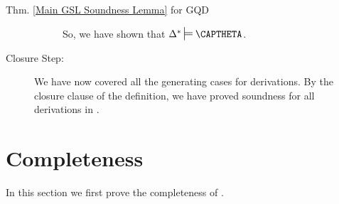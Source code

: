 \begin{PROOFOF}{Thm. \ref{Main GSL Soundness Lemma} for GQD}
\begin{description}
\begin{description}
So, we have shown that $\Delta^*\sdtstile{}{}\CAPTHETA$.

\end{description}

\item[Closure Step:] We have now covered all the generating cases for derivations. By the closure clause of the definition, we have proved soundness for all derivations in \GQD{}. 

\end{description}
\end{PROOFOF} 

\section{Completeness}\label{Section:Completeness for GSD}

In this section we first prove the completeness of \GSD{}.

